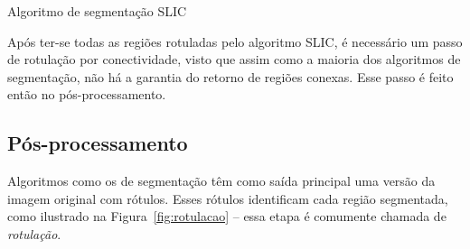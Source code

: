 \begin{espacosimples}
\begin{algorithm2e}[H]
  \caption{Algoritmo de segmentação SLIC}
  \label{algo:slic}
  \SetAlgoLined



\end{algorithm2e}
\end{espacosimples}

\vspace{1.0cm}

Após ter-se todas as regiões rotuladas pelo algoritmo SLIC, é necessário um
passo de rotulação por conectividade, visto que assim como a maioria dos
algoritmos de segmentação, não há a garantia do retorno de regiões
conexas. Esse passo é feito então no pós-processamento.

\subsection{Pós-processamento}
\label{sec:posproc}

Algoritmos como os de segmentação têm como saída principal uma versão da imagem
original com rótulos. Esses rótulos identificam cada região segmentada, como
ilustrado na Figura~\ref{fig:rotulacao} -- essa etapa é comumente chamada de
\emph{rotulação}. 

